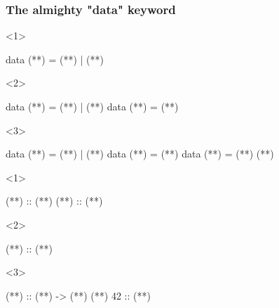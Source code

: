 \documentclass[17pt]{beamer}
\renewcommand{\(}[1]{\begin{columns}[#1]}
\renewcommand{\)}{\end{columns}}
\newcommand{\<}[1]{\begin{column}{#1}}
\renewcommand{\>}{\end{column}}
\begin{document}
\begin{frame}[fragile]
  \frametitle{The almighty "data" keyword}
  \begin{minipage}[t][.4\textheight]{\textwidth}
    \begin{onlyenv}<1>
      \begin{code}
data (**)    = (**) | (**)
      \end{code}
    \end{onlyenv}
    \begin{onlyenv}<2>
      \begin{code}
data (**)    = (**) | (**)
data (**)    = (**)
      \end{code}
    \end{onlyenv}
    \begin{onlyenv}<3>
      \begin{code}
data (**)    = (**) | (**)
data (**)    = (**)
data (**) = (**) (**)
      \end{code}
    \end{onlyenv}
  \end{minipage}
  \begin{minipage}[c][.3\textheight]{\textwidth}
    \begin{center}
      \begin{onlyenv}<1>
        \begin{code}[types]
(**)  :: (**)
(**) :: (**)
        \end{code}
      \end{onlyenv}
      \begin{onlyenv}<2>
        \begin{code}[types]
(**) :: (**)
        \end{code}
      \end{onlyenv}
      \begin{onlyenv}<3>
        \begin{code}[types]
(**)    :: (**) -> (**)
(**) 42 ::        (**)
        \end{code}
      \end{onlyenv}
    \end{center}
  \end{minipage}
\end{frame}
\end{document}
